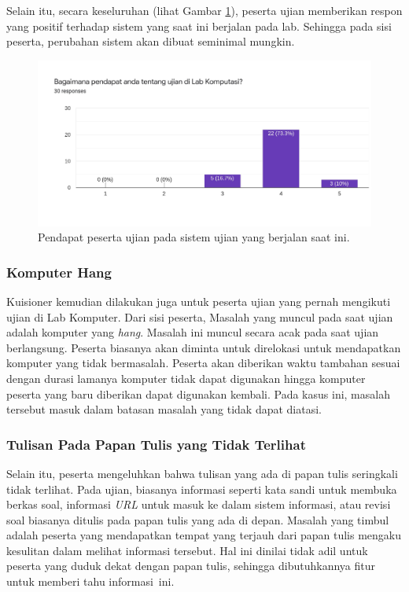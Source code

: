     Selain itu, secara keseluruhan (lihat Gambar \ref{fig:kuisioner-student-2}),
    peserta ujian memberikan respon yang positif terhadap sistem yang saat ini
    berjalan pada lab. Sehingga pada sisi peserta, perubahan sistem akan dibuat
    seminimal mungkin.

    \begin{figure}
        \centering
        \includegraphics[width=0.7\paperwidth]{Gambar/survey-student-2.pdf}
        \caption{Pendapat peserta ujian pada sistem ujian yang berjalan saat ini.}
        \label{fig:kuisioner-student-2}
    \end{figure}

    \subsubsection{Komputer Hang}\label{ref-prob-peserta-kompu-hang} Kuisioner
    kemudian dilakukan juga untuk peserta ujian yang pernah mengikuti ujian di
    Lab Komputer. Dari sisi peserta, Masalah yang muncul pada saat ujian adalah
    komputer yang \textit{hang}. Masalah ini muncul secara acak pada saat ujian
    berlangsung. Peserta biasanya akan diminta untuk direlokasi untuk
    mendapatkan komputer yang tidak bermasalah. Peserta akan diberikan waktu
    tambahan sesuai dengan durasi lamanya komputer tidak dapat digunakan hingga
    komputer peserta yang baru diberikan dapat digunakan kembali. Pada kasus
    ini, masalah tersebut masuk dalam batasan masalah yang tidak dapat diatasi.
    
    \subsubsection{Tulisan Pada Papan Tulis yang Tidak
    Terlihat}\label{ref-prob-peserta-papan-tulis} Selain itu, peserta
    mengeluhkan bahwa tulisan yang ada di papan tulis seringkali tidak terlihat.
    Pada ujian, biasanya informasi seperti kata sandi untuk membuka berkas soal,
    informasi \textit{URL} untuk masuk ke dalam sistem informasi, atau revisi
    soal biasanya ditulis pada papan tulis yang ada di depan. Masalah yang
    timbul adalah peserta yang mendapatkan tempat yang terjauh dari papan tulis
    mengaku kesulitan dalam melihat informasi tersebut. Hal ini dinilai tidak
    adil untuk peserta yang duduk dekat dengan papan tulis, sehingga
    dibutuhkannya fitur untuk memberi tahu informasi~ini.


